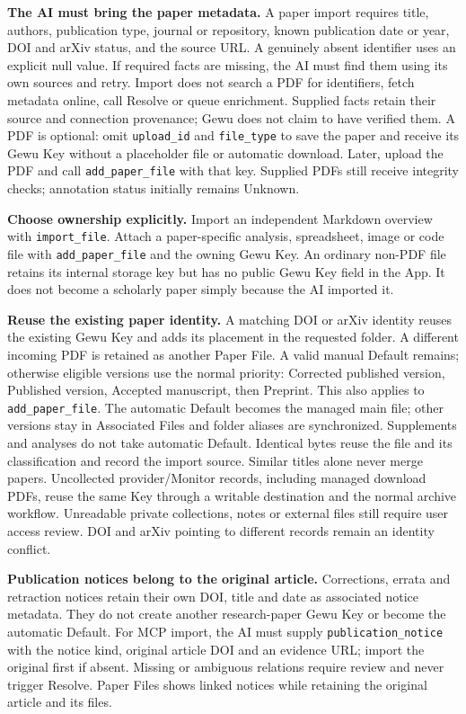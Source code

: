 \documentclass[10pt,letterpaper,oneside]{scrreprt}
\begin{document}
\textbf{The AI must bring the paper metadata.} A paper import requires title, authors, publication type, journal or repository, known publication date or year, DOI and arXiv status, and the source URL. A genuinely absent identifier uses an explicit null value. If required facts are missing, the AI must find them using its own sources and retry. Import does not search a PDF for identifiers, fetch metadata online, call Resolve or queue enrichment. Supplied facts retain their source and connection provenance; Gewu does not claim to have verified them. A PDF is optional: omit \texttt{upload\_id} and \texttt{file\_type} to save the paper and receive its Gewu Key without a placeholder file or automatic download. Later, upload the PDF and call \texttt{add\_paper\_file} with that key. Supplied PDFs still receive integrity checks; annotation status initially remains Unknown.

\textbf{Choose ownership explicitly.} Import an independent Markdown overview with \texttt{import\_file}. Attach a paper-specific analysis, spreadsheet, image or code file with \texttt{add\_paper\_file} and the owning Gewu Key. An ordinary non-PDF file retains its internal storage key but has no public Gewu Key field in the App. It does not become a scholarly paper simply because the AI imported it.

\textbf{Reuse the existing paper identity.} A matching DOI or arXiv identity reuses the existing Gewu Key and adds its placement in the requested folder. A different incoming PDF is retained as another Paper File. A valid manual Default remains; otherwise eligible versions use the normal priority: Corrected published version, Published version, Accepted manuscript, then Preprint. This also applies to \texttt{add\_paper\_file}. The automatic Default becomes the managed main file; other versions stay in Associated Files and folder aliases are synchronized. Supplements and analyses do not take automatic Default. Identical bytes reuse the file and its classification and record the import source. Similar titles alone never merge papers. Uncollected provider/Monitor records, including managed download PDFs, reuse the same Key through a writable destination and the normal archive workflow. Unreadable private collections, notes or external files still require user access review. DOI and arXiv pointing to different records remain an identity conflict.

\textbf{Publication notices belong to the original article.} Corrections, errata and retraction notices retain their own DOI, title and date as associated notice metadata. They do not create another research-paper Gewu Key or become the automatic Default. For MCP import, the AI must supply \texttt{publication\_notice} with the notice kind, original article DOI and an evidence URL; import the original first if absent. Missing or ambiguous relations require review and never trigger Resolve. Paper Files shows linked notices while retaining the original article and its files.
\end{document}
